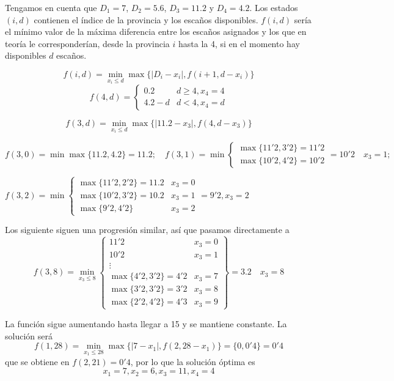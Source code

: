 \documentclass[twoside]{article}
\begin{document}
\begin{solucion}
Tengamos en cuenta que $D_1=7$, $D_2=5.6$, $D_3=11.2$ y $D_4=4.2$. Los estados $(i,d)$ contienen el índice de la provincia y los escaños disponibles.
$f(i,d)$ sería el mínimo valor de la máxima diferencia entre los escaños asignados y los que en teoría le corresponderían, desde la provincia $i$ hasta la 4, si en el momento hay disponibles $d$ escaños. 

$$f(i,d)=\min_{x_i\leq d}\max\{|D_i-x_i|,f(i+1,d-x_i)\}$$
$$f(4,d)=\begin{cases}
0.2 & d\geq 4,x_4=4\\
4.2-d & d<4, x_4=d
\end{cases}$$

$$f(3,d)=\min_{x_i\leq d}\max\{|11.2-x_3|,f(4,d-x_3)\}$$

$f(3,0)=\min\max\{11.2,4.2\}=11.2;\quad f(3,1)=\min\begin{cases}
\max\{11'2,3'2\}=11'2\\
\max\{10'2,4'2\}=10'2
\end{cases}=10'2\quad x_3=1;$

$f(3,2)=\min\begin{cases}
\max\{11'2,2'2\}=11.2 & x_3=0\\
\max\{10'2,3'2\}=10.2 & x_3=1\\
\max\{9'2,4'2\} & x_3=2
\end{cases}=9'2, x_3=2$

Los siguiente siguen una progresión similar, así que pasamos directamente a 
$$f(3,8)=\min_{x_3\leq 8}\left.\begin{cases}
11'2 & x_3=0\\
10'2 & x_3=1\\
\vdots & \\
\max\{4'2,3'2\}=4'2 & x_3=7\\
\max\{3'2,3'2\}=3'2 & x_3=8\\
\max\{2'2,4'2\}=4'3 & x_3=9
\end{cases}\right\}= 3.2\quad x_3=8$$

La función sigue aumentando hasta llegar a 15 y se mantiene constante. La solución será 
$$f(1,28)=\min_{x_1\leq 28}\max\{|7-x_1|,f(2,28-x_1)\}=\{0,0'4\}=0'4$$
que se obtiene en $f(2,21)=0'4$, por lo que la solución óptima es 
$$\boxed{x_1=7, x_2=6,x_3=11,x_4=4}$$

\end{solucion}

\newpage
\end{document}
